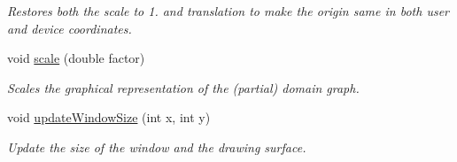 \begin{DoxyCompactItemize}
\begin{DoxyCompactList}\small\item\em Restores both the scale to 1. and translation to make the origin same in both user and device coordinates. \end{DoxyCompactList}\item 
void \hyperlink{structslb_1_1core_1_1ui_1_1Graphics_a6f285650256346fdd36fe7cb3b562cbb}{scale} (double factor)
\begin{DoxyCompactList}\small\item\em Scales the graphical representation of the (partial) domain graph. \end{DoxyCompactList}\item 
void \hyperlink{structslb_1_1core_1_1ui_1_1Graphics_afdba5da7dc3fd6e716bd3a464212404a}{update\+Window\+Size} (int x, int y)
\begin{DoxyCompactList}\small\item\em Update the size of the window and the drawing surface. \end{DoxyCompactList}\end{DoxyCompactItemize}
